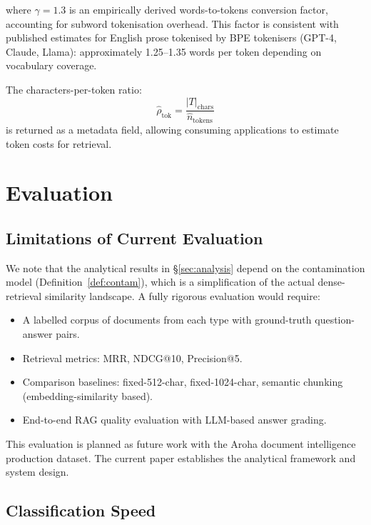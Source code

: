 \documentclass[conference]{IEEEtran}
\begin{document}
where $\gamma = 1.3$ is an empirically derived words-to-tokens
conversion factor, accounting for subword tokenisation
overhead. This factor is consistent with published estimates
for English prose tokenised by BPE tokenisers (GPT-4,
Claude, Llama): approximately 1.25--1.35 words per token
depending on vocabulary coverage.

The characters-per-token ratio:
\begin{equation}
  \hat{\rho}_{\text{tok}} = \frac{|T|_{\text{chars}}}
    {\hat{n}_{\text{tokens}}}
  \label{eq:chars_per_tok}
\end{equation}
is returned as a metadata field, allowing consuming
applications to estimate token costs for retrieval.

\section{Evaluation}
\label{sec:eval}

\subsection{Limitations of Current Evaluation}

We note that the analytical results in \S\ref{sec:analysis}
depend on the contamination model (Definition~\ref{def:contam}),
which is a simplification of the actual dense-retrieval
similarity landscape. A fully rigorous evaluation would
require:
\begin{itemize}
  \item A labelled corpus of documents from each type with
    ground-truth question-answer pairs.
  \item Retrieval metrics: MRR, NDCG@10, Precision@5.
  \item Comparison baselines: fixed-512-char, fixed-1024-char,
    semantic chunking (embedding-similarity based).
  \item End-to-end RAG quality evaluation with LLM-based
    answer grading.
\end{itemize}
This evaluation is planned as future work with the Aroha
document intelligence production dataset. The current paper
establishes the analytical framework and system design.

\subsection{Classification Speed}
\end{document}
